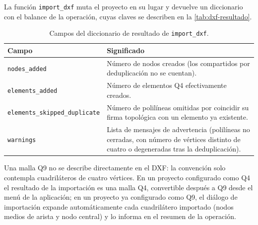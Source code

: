 La función \texttt{import\_dxf} muta el proyecto en su lugar y devuelve un diccionario con el balance de la operación, cuyas claves se describen en la \autoref{tab:dxf-resultado}.

\begin{table}[htbp]
\centering
\caption{Campos del diccionario de resultado de \texttt{import\_dxf}.}
\label{tab:dxf-resultado}
\begin{tabular}{l p{8.4cm}}
\toprule
\textbf{Campo} & \textbf{Significado} \\
\midrule
\texttt{nodes\_added}                & Número de nodos creados (los compartidos por deduplicación no se cuentan). \\
\texttt{elements\_added}             & Número de elementos Q4 efectivamente creados. \\
\texttt{elements\_skipped\_duplicate} & Número de polilíneas omitidas por coincidir su firma topológica con un elemento ya existente. \\
\texttt{warnings}                    & Lista de mensajes de advertencia (polilíneas no cerradas, con número de vértices distinto de cuatro o degeneradas tras la deduplicación). \\
\bottomrule
\end{tabular}
\end{table}

Una malla Q9 no se describe directamente en el DXF: la convención solo contempla cuadriláteros de cuatro vértices. En un proyecto configurado como Q4 el resultado de la importación es una malla Q4, convertible después a Q9 desde el menú de la aplicación; en un proyecto ya configurado como Q9, el diálogo de importación expande automáticamente cada cuadrilátero importado (nodos medios de arista y nodo central) y lo informa en el resumen de la operación.



